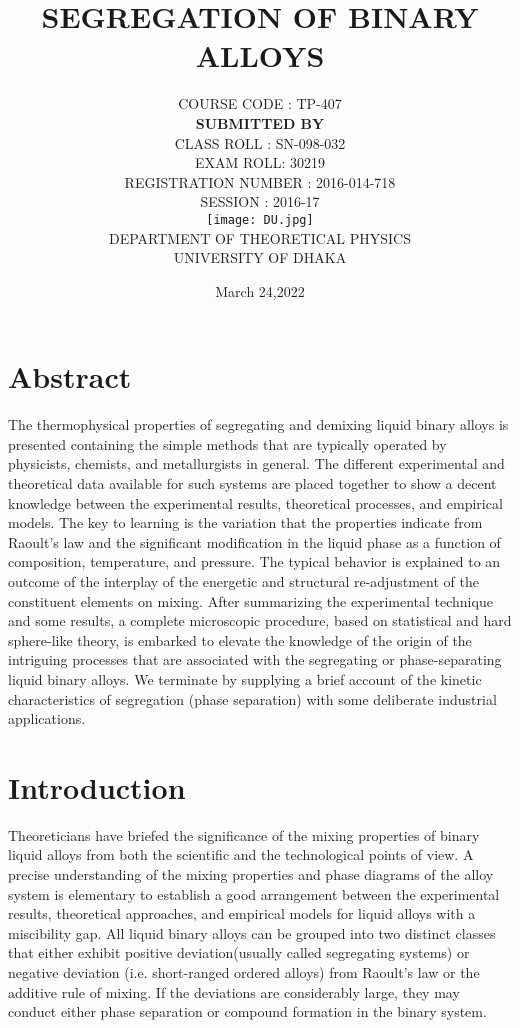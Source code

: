 \documentclass[12pt]{article}
\title{\color{blue} \Huge{ SEGREGATION OF BINARY ALLOYS}}
\author{ COURSE CODE : TP-407 \\ [20PT] \textbf{SUBMITTED BY}
 \\ [5PT] \Large CLASS ROLL : SN-098-032 \\ \Large EXAM ROLL: 30219 \\
  \Large REGISTRATION NUMBER : 2016-014-718 \\   \Large  SESSION : 2016-17
\\ [10pt] 
\texttt{[image: DU.jpg]} \\ [10pt] \Large DEPARTMENT OF THEORETICAL PHYSICS \\ UNIVERSITY OF DHAKA 
}
\date{March 24,2022}
\newcommand*{\1}{\hspace{1pt}}
\begin{document}
	\maketitle
    \tableofcontents
    \listoffigures
	
	


    \newpage
    \section{Abstract}
    The thermophysical properties of segregating and demixing liquid binary
    alloys is presented containing the simple methods that are typically operated by
    physicists, chemists, and metallurgists in general. The different experimental and theoretical data 
    available for such systems are placed together to show a decent knowledge between the experimental 
    results, theoretical processes, and empirical models. The key to learning is the variation that the 
    properties indicate from Raoult's
    law and the significant modification in the liquid phase as a function of composition, temperature, 
    and pressure. The typical behavior is explained to an outcome of the interplay of
    the energetic and structural re-adjustment of the constituent elements on mixing. After summarizing 
    the experimental technique and some results, a complete microscopic
    procedure, based on statistical and hard sphere-like theory, is embarked to elevate the knowledge 
    of the origin of the intriguing processes that are associated with the segregating or phase-separating 
    liquid binary alloys. We terminate by supplying a brief account
    of the kinetic characteristics of segregation (phase separation) with some deliberate industrial 
    applications.

        \section{Introduction}
        Theoreticians have briefed the significance of the mixing properties of binary liquid alloys 
        from both the scientific and the technological points of view. A precise understanding of 
        the mixing properties and phase diagrams of the alloy system is elementary to establish a 
        good arrangement between the experimental results, theoretical approaches, and empirical 
        models for liquid alloys with a miscibility gap.
        All liquid binary alloys can be grouped into two distinct classes that either exhibit 
        positive deviation(usually called segregating systems) or negative deviation (i.e. 
        short-ranged ordered alloys) from Raoult's law or the additive rule of mixing. If the 
        deviations are considerably large, they may conduct either phase separation or compound 
        formation in the binary system. \\
\end{document}
